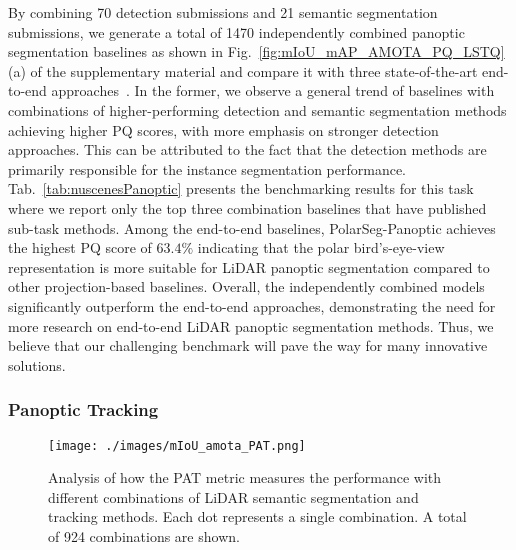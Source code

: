 \documentclass[letterpaper, 10 pt, journal, twoside]{IEEEtran}
\newcommand{\figref}[1]{Fig.~\ref{#1}}
\newcommand{\tabref}[1]{Tab.~\ref{#1}}
\begin{document}
By combining 70 detection submissions and 21 semantic segmentation submissions, we generate a total of 1470 independently combined panoptic segmentation baselines as shown in \figref{fig:mIoU_mAP_AMOTA_PQ_LSTQ}(a) of the supplementary material and compare it with three state-of-the-art end-to-end approaches~\cite{hurtado2020mopt, sirohi2021efficientlps, zhou2021panoptic}. In the former, we observe a general trend of baselines with combinations of higher-performing detection and semantic segmentation methods achieving higher PQ scores, with more emphasis on stronger detection approaches. This can be attributed to the fact that the detection methods are primarily responsible for the instance segmentation performance. \tabref{tab:nuscenesPanoptic} presents the benchmarking results for this task where we report only the top three combination baselines that have published sub-task methods. Among the end-to-end baselines, PolarSeg-Panoptic achieves the highest PQ score of $63.4\%$ indicating that the polar bird's-eye-view representation is more suitable for LiDAR panoptic segmentation compared to other projection-based baselines. 
Overall, the independently combined models significantly outperform the end-to-end approaches, demonstrating the need for more research on end-to-end LiDAR panoptic segmentation methods. Thus, we believe that our challenging benchmark will pave the way for many innovative solutions.  

\subsubsection{Panoptic Tracking}

\begin{figure}
\centering
\texttt{[image: ./images/mIoU\_amota\_PAT.png]}
\caption{Analysis of how the PAT metric measures the performance with different combinations of LiDAR semantic segmentation and tracking methods. Each dot represents a single combination. A total of 924 combinations are shown.}
\label{fig:mIoU_amota_PAT}
\vspace{-0.2cm}
\end{figure}
\end{document}
